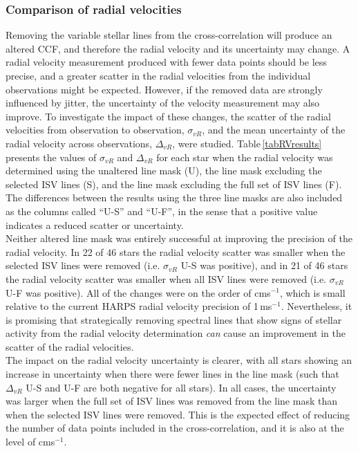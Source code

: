 \subsubsection{Comparison of radial velocities}
Removing the variable stellar lines from the cross-correlation will produce an altered CCF, and therefore the radial velocity and its uncertainty may change. A radial velocity measurement produced with fewer data points should be less precise, and a greater scatter in the radial velocities from the individual observations might be expected. However, if the removed data are strongly influenced by jitter, the uncertainty of the velocity measurement may also improve. To investigate the impact of these changes, the scatter of the radial velocities from observation to observation, $\sigma_{vR}$, and the mean uncertainty of the radial velocity across observations, $\Delta_{vR}$, were studied. Table\,\ref{tabRVresults} presents the values of $\sigma_{vR}$ and $\Delta_{vR}$ for each star when the radial velocity was determined using the unaltered line mask (U), the line mask excluding the selected ISV lines (S), and the line mask excluding the full set of ISV lines (F). The differences between the results using the three line masks are also included as the columns called ``U-S'' and ``U-F'', in the sense that a positive value indicates a reduced scatter or uncertainty.\\

Neither altered line mask was entirely successful at improving the precision of the radial velocity. In 22 of 46 stars the radial velocity scatter was smaller when the selected ISV lines were removed (i.e. $\sigma_{vR}$ U-S was positive), and in 21 of 46 stars the radial velocity scatter was smaller when all ISV lines were removed (i.e. $\sigma_{vR}$ U-F was positive). All of the changes were on the order of cms$^{-1}$, which is small relative to the current HARPS radial velocity precision of 1\,ms$^{-1}$. Nevertheless, it is promising that strategically removing spectral lines that show signs of stellar activity from the radial velocity determination \emph{can} cause an improvement in the scatter of the radial velocities.\\

The impact on the radial velocity uncertainty is clearer, with all stars showing an increase in uncertainty when there were fewer lines in the line mask (such that $\Delta_{vR}$ U-S and U-F are both negative for all stars). In all cases, the uncertainty was larger when the full set of ISV lines was removed from the line mask than when the selected ISV lines were removed. This is the expected effect of reducing the number of data points included in the cross-correlation, and it is also at the level of cms$^{-1}$.

